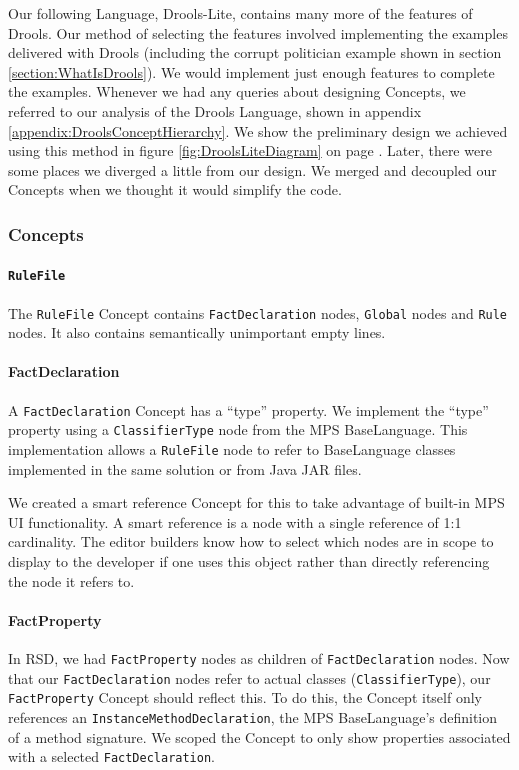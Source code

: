 Our following Language, Drools-Lite, contains many more of the features of Drools.
Our method of selecting the features involved implementing the examples delivered with Drools (including the corrupt politician example shown in section \ref{section:WhatIsDrools}).
We would implement just enough features to complete the examples.
Whenever we had any queries about designing Concepts, we referred to our analysis of the Drools Language, shown in appendix \ref{appendix:DroolsConceptHierarchy}.
We show the preliminary design we achieved using this method in figure \ref{fig:DroolsLiteDiagram} on page \pageref{fig:DroolsLiteDiagram}.
Later, there were some places we diverged a little from our design.
We merged and decoupled our Concepts when we thought it would simplify the code.

\subsubsection{Concepts}

\paragraph{\texttt{RuleFile}} The \texttt{RuleFile} Concept contains \texttt{FactDeclaration} nodes, \texttt{Global} nodes and \texttt{Rule} nodes.
It also contains semantically unimportant empty lines.

\paragraph{FactDeclaration} A \texttt{FactDeclaration} Concept has a ``type'' property.
We implement the ``type'' property using a \texttt{ClassifierType} node from the MPS BaseLanguage.
This implementation allows a \texttt{RuleFile} node to refer to BaseLanguage classes implemented in the same solution or from Java JAR files.

We created a smart reference Concept for this to take advantage of built-in MPS UI functionality.
A smart reference is a node with a single reference of 1:1 cardinality.
The editor builders know how to select which nodes are in scope to display to the developer if one uses this object rather than directly referencing the node it refers to.

\paragraph{FactProperty} In RSD, we had \texttt{FactProperty} nodes as children of \texttt{FactDeclaration} nodes.
Now that our \texttt{FactDeclaration} nodes refer to actual classes (\texttt{ClassifierType}), our \texttt{FactProperty} Concept should reflect this.
To do this, the Concept itself only references an \texttt{InstanceMethodDeclaration}, the MPS BaseLanguage's definition of a method signature.
We scoped the Concept to only show properties associated with a selected \texttt{FactDeclaration}.

